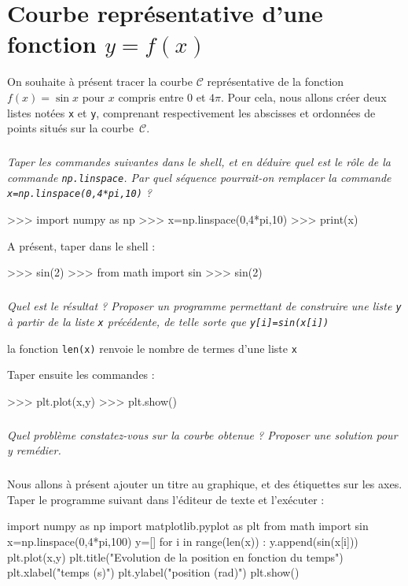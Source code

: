 \documentclass[10pt]{article}
\begin{document}
\section{Courbe représentative d'une fonction $y=f(x)$}
\setcounter{subparagraph}{0}
On souhaite à présent tracer la courbe $\mathcal{C}$ représentative de la fonction $f(x)=\sin x$ pour $x$ compris entre 0 et $4\pi$. Pour cela, nous allons créer deux listes notées \texttt{x} et \texttt{y}, comprenant respectivement les abscisses et ordonnées de points situés sur la courbe~$\mathcal{C}$.


\subparagraph{}
\textit{Taper les commandes suivantes dans le shell, et en déduire quel est le rôle de la commande \texttt{np.linspace}. Par quel séquence pourrait-on remplacer la commande \texttt{x=np.linspace(0,4*pi,10)} ?}
\begin{py}
\begin{python}
>>> import numpy as np
>>> x=np.linspace(0,4*pi,10)
>>> print(x)
\end{python}
\end{py}

A présent, taper dans le shell :
\begin{py}
\begin{python}
>>> sin(2)
>>> from math import sin
>>> sin(2)
\end{python}
\end{py}

\subparagraph{}
\textit{Quel est le résultat ? Proposer un programme permettant de construire une liste \texttt{y} à partir de la liste \texttt{x} précédente, de telle sorte que \texttt{y[i]=sin(x[i])}}

\begin{rem}
la fonction \texttt{len(x)} renvoie le nombre de termes d'une  liste \texttt{x}
\end{rem}

Taper ensuite les commandes :
\begin{py}
\begin{python}
>>> plt.plot(x,y)
>>> plt.show()
\end{python}
\end{py}

\subparagraph{}
\textit{Quel problème constatez-vous sur la courbe obtenue ? Proposer une solution pour y remédier.}

\subparagraph{}
Nous allons à présent ajouter un titre au graphique, et des étiquettes sur les axes. Taper le programme suivant dans l'éditeur de texte et l'exécuter :
\begin{py}
\begin{python}
import numpy as np
import matplotlib.pyplot as plt
from math import sin
x=np.linspace(0,4*pi,100)
y=[]
for i in range(len(x)) :
	y.append(sin(x[i]))
plt.plot(x,y)
plt.title("Evolution de la position en fonction du temps")
plt.xlabel("temps (s)")
plt.ylabel("position (rad)")
plt.show()
\end{python}
\end{py}
\end{document}

